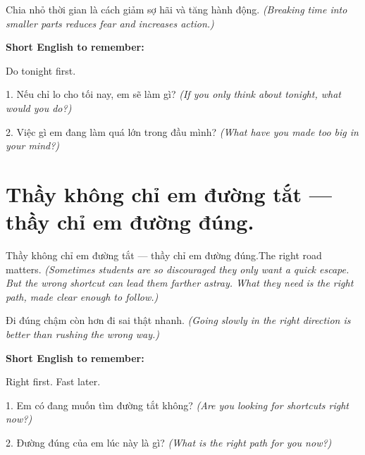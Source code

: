 \begin{baihoc}
Chia nhỏ thời gian là cách giảm sợ hãi và tăng hành động.
\textit{(Breaking time into smaller parts reduces fear and increases action.)}
\end{baihoc}

\begin{ghinhoanh}
\textbf{Short English to remember:}

Do tonight first.

\end{ghinhoanh}

\begin{tuhocnhanh}
1. Nếu chỉ lo cho tối nay, em sẽ làm gì? \textit{(If you only think about tonight, what would you do?)}

2. Việc gì em đang làm quá lớn trong đầu mình? \textit{(What have you made too big in your mind?)}
\end{tuhocnhanh}
\ngancach


\section{Thầy không chỉ em đường tắt — thầy chỉ em đường đúng.}
\begin{truyen}{Thầy không chỉ em đường tắt — thầy chỉ em đường đúng.}{The right road matters.}
\textit{(Sometimes students are so discouraged they only want a quick escape. But the wrong shortcut can lead them farther astray. What they need is the right path, made clear enough to follow.)}
\end{truyen}

\begin{baihoc}
Đi đúng chậm còn hơn đi sai thật nhanh.
\textit{(Going slowly in the right direction is better than rushing the wrong way.)}
\end{baihoc}

\begin{ghinhoanh}
\textbf{Short English to remember:}

Right first. Fast later.

\end{ghinhoanh}

\begin{tuhocnhanh}
1. Em có đang muốn tìm đường tắt không? \textit{(Are you looking for shortcuts right now?)}

2. Đường đúng của em lúc này là gì? \textit{(What is the right path for you now?)}
\end{tuhocnhanh}
\ngancach


